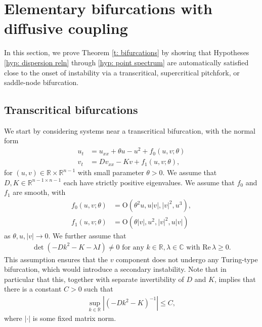 \documentclass[11pt]{article}
\newcommand{\R}{\mathbb{R}}
\newcommand{\C}{\mathbb{C}}
\renewcommand{\Re}{\mathrm{Re} \,}
\numberwithin{equation}{section}
\numberwithin{prop}{section}
\begin{document}
\section{Elementary bifurcations with diffusive coupling}\label{s: transcritical}

In this section, we prove Theorem \ref{t: bifurcations} by showing that Hypotheses \ref{hyp: dispersion reln} through \ref{hyp: point spectrum} are automatically satisfied close to the onset of instability via a transcritical, supercritical pitchfork, or saddle-node bifurcation. 

\subsection{Transcritical bifurcations}
We start by considering systems near a transcritical bifurcation, with the normal form
\begin{align}
	u_t &= u_{xx} + \theta u - u^2 + f_0 (u, v; \theta) \label{e: transcritical 1}\\
	v_t &= D v_{xx} - K v + f_1 (u, v; \theta), \label{e: transcritical 2}
\end{align}
for $(u, v) \in \R \times \R^{n-1}$ with small parameter $\theta > 0$. We assume that $D, K \in \R^{n-1 \times n-1}$ each have strictly positive eigenvalues. We assume that $f_0$ and $f_1$ are smooth, with
\begin{align}
	f_0 (u, v; \theta) &= \mathrm{O}\left(\theta^2 u, u |v|, |v|^2, u^3 \right), \label{e: transcritical nonlinearity expansions 1}\\
	f_1 (u, v; \theta) &= \mathrm{O}\left(\theta |v|, u^2, |v|^2, u|v| \right) \label{e: transcritical nonlinearity expansions 2}
\end{align}
as $\theta, u, |v| \to 0$. We further assume that 
\begin{align}
	\det (- D k^2 - K- \lambda I) \neq 0 \text{ for any } k \in \R, \lambda \in \C \text{ with } \Re \lambda \geq 0.  \label{e: no turing}
\end{align}
This assumption ensures that the $v$ component does not undergo any Turing-type bifurcation, which would introduce a secondary instability. Note that in particular that this, together with separate invertibility of $D$ and $K$, implies that there is a constant $C > 0$ such that
\begin{align}
	\sup_{k \in \R} |(-Dk^2 - K)^{-1} | \leq C, \label{e: transcritical uniform bound symbol}
\end{align}
where $|\cdot|$ is some fixed matrix norm. 
\end{document}
